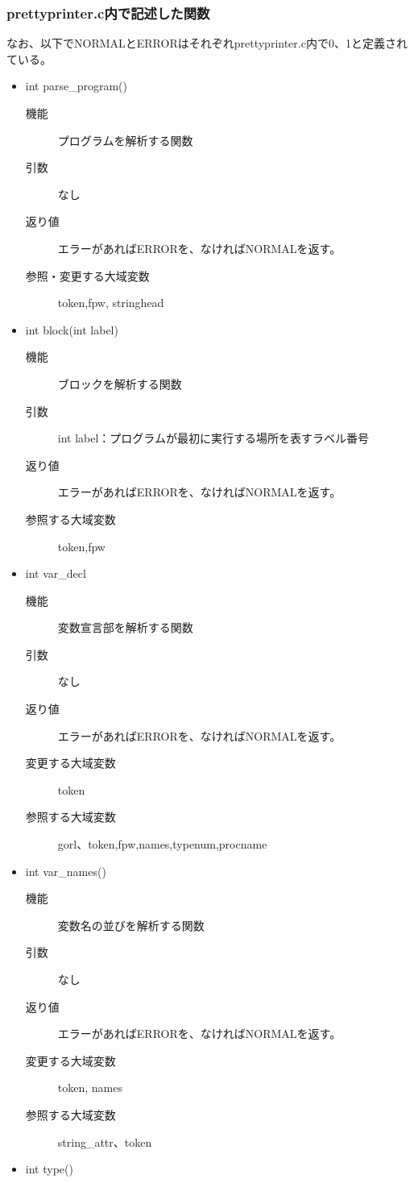 \documentclass{jarticle}
\begin{document}
\subsubsection{prettyprinter.c内で記述した関数}
なお、以下でNORMALとERRORはそれぞれprettyprinter.c内で0、1と定義されている。
\begin{itemize}
  \item int parse\_program()
  \begin{description}
\item[機能]プログラムを解析する関数
\item[引数]なし
\item[返り値]エラーがあればERRORを、なければNORMALを返す。
\item[参照・変更する大域変数]token,fpw, stringhead
\end{description}
\item int block(int label)
\begin{description}
\item[機能]ブロックを解析する関数
\item[引数]int label：プログラムが最初に実行する場所を表すラベル番号
\item[返り値]エラーがあればERRORを、なければNORMALを返す。
\item[参照する大域変数]token,fpw
\end{description}
\item int var\_decl
\begin{description}
\item[機能]変数宣言部を解析する関数
\item[引数]なし
\item[返り値]エラーがあればERRORを、なければNORMALを返す。
\item[変更する大域変数]token
\item[参照する大域変数]gorl、token,fpw,names,typenum,procname
\end{description}
\item int var\_names()
\begin{description}
\item[機能]変数名の並びを解析する関数
\item[引数]なし
\item[返り値]エラーがあればERRORを、なければNORMALを返す。
\item[変更する大域変数]token, names
\item[参照する大域変数]string\_attr、token
\end{description}
\item int type()

\end{itemize}
\end{document}
